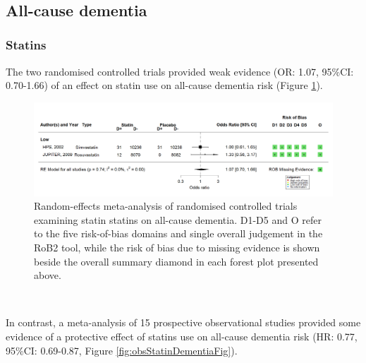 \documentclass[a4paper, twoside]{templates/ociamthesis}
\begin{document}
~

\hypertarget{sys-rev-res-Dementia}{%
\subsection{All-cause dementia}\label{sys-rev-res-Dementia}}

\hypertarget{statins}{%
\subsubsection{Statins}\label{statins}}

The two randomised controlled trials provided weak evidence (OR: 1.07, 95\%CI: 0.70-1.66) of an effect on statin use on all-cause dementia risk (Figure \ref{fig:rctStatinDementiaFig}).





\begin{figure}[H]
\includegraphics[width=1\linewidth]{figures/sys-rev/fp_rct_statins_Dementia} \caption[Random-effects meta-analysis of statins on all-cause dementia]{Random-effects meta-analysis of randomised controlled trials examining statin statins on all-cause dementia. D1-D5 and O refer to the five risk-of-bias domains and single overall judgement in the RoB2 tool, while the risk of bias due to missing evidence is shown beside the overall summary diamond in each forest plot presented above.}\label{fig:rctStatinDementiaFig}
\end{figure}

~

In contrast, a meta-analysis of 15 prospective observational studies provided some evidence of a protective effect of statins use on all-cause dementia risk (HR: 0.77, 95\%CI: 0.69-0.87, Figure \ref{fig:obsStatinDementiaFig}).
\end{document}
